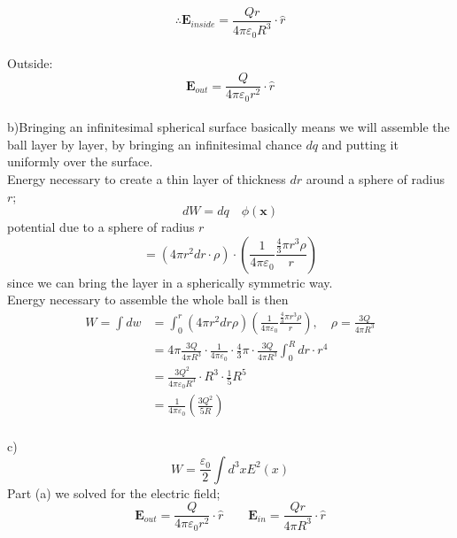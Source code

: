 \documentclass[letterpage]{article}
\begin{document}
\begin{equation*}  
  \therefore \textbf{E}_{inside} = \frac{Qr}{4\pi \varepsilon_0 R^3} \cdot
  \hat{r}
\end{equation*}\\
\noindent
Outside:
\begin{equation*}
  \textbf{E}_{out} = \frac{Q}{4\pi \varepsilon_0 r^2} \cdot \hat{r}
\end{equation*}\\
\noindent
b)Bringing an infinitesimal spherical surface basically means we will assemble
the ball layer by layer, by bringing an infinitesimal chance $dq$ and putting
it uniformly over the surface.\\
\noindent
Energy necessary to create a thin layer of thickness $dr$ around a sphere of 
radius $r$;
\begin{equation*}
  dW = dq \quad \phi(\textbf{x})
\end{equation*}
potential due to a sphere of radius $r$
\begin{equation*}
  = \left(4\pi r^2 dr \cdot \rho \right) \cdot 
  \left(\frac{1}{4\pi \varepsilon_0} 
  \frac{\frac{4}{3} \pi r^3 \rho}{r}\right)
\end{equation*}
since we can bring the layer in a spherically symmetric way.\\
\noindent
Energy necessary to assemble the whole ball is then
\begin{align*}
  W = \int dw &= \int_0^r \left(4\pi r^2 dr \rho \right) 
  \left(\frac{1}{4\pi \varepsilon_0} \frac{\frac{4}{3}\pi r^3 \rho}{r} \right)
  , \quad \rho = \frac{3Q}{4\pi R^3}\\
  &= 4\pi \frac{3Q}{4\pi R^3} \cdot \frac{1}{4\pi \varepsilon_0} \cdot
  \frac{4}{3}\pi \cdot \frac{3Q}{4\pi R^3} \int_0^R dr \cdot r^4\\
  &= \frac{3Q^2}{4\pi \varepsilon_0 R^3} \cdot R^3 \cdot \frac{1}{5} R^5\\
  &= \frac{1}{4\pi \varepsilon_0} \left(\frac{3Q^2}{5R} \right)
\end{align*}\\
\noindent
c)
\begin{equation*}
  W = \frac{\varepsilon_0}{2} \int d^3x E^2(x)
\end{equation*}
Part (a) we solved for the electric field;
\begin{equation*}
  \textbf{E}_{out} = \frac{Q}{4\pi \varepsilon_0 r^2} \cdot \hat{r} 
  \qquad \textbf{E}_{in} = \frac{Qr}{4\pi R^3} \cdot \hat{r}
\end{equation*}
\end{document}
